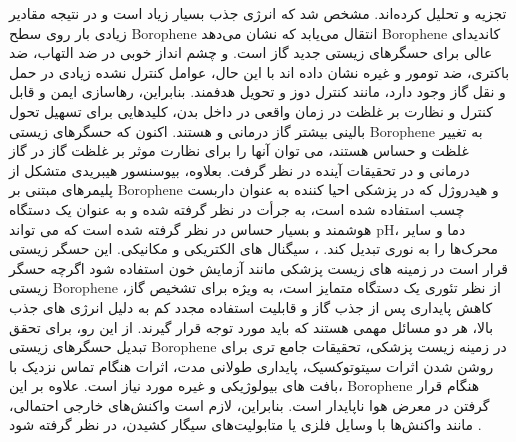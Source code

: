 تجزیه و تحلیل کرده‌اند. مشخص شد که انرژی جذب بسیار زیاد است و در نتیجه مقادیر زیادی بار روی سطح \gls{Borophene} انتقال می‌یابد که نشان می‌دهد \gls{Borophene} کاندیدای عالی برای حسگرهای زیستی جدید گاز است.  و  چشم انداز خوبی در ضد التهاب، ضد باکتری، ضد تومور و غیره نشان داده اند \cite{otterbeinCarbonMonoxideHas2000} با این حال، عوامل کنترل نشده زیادی در حمل و نقل گاز وجود دارد، مانند کنترل دوز و تحویل هدفمند. بنابراین، رهاسازی ایمن و قابل کنترل و نظارت بر غلظت در زمان واقعی در داخل بدن، کلیدهایی برای تسهیل تحول بالینی بیشتر گاز درمانی  و  هستند. اکنون که حسگرهای زیستی \gls{Borophene} به تغییر غلظت  و  حساس هستند، می توان آنها را برای نظارت موثر بر غلظت گاز در گاز درمانی  و  در تحقیقات آینده در نظر گرفت. بعلاوه، بیوسنسور هیبریدی متشکل از پلیمرهای مبتنی بر \gls{Borophene} و هیدروژل که در پزشکی احیا کننده به عنوان داربست چسب استفاده شده است، به جرأت در نظر گرفته شده و به عنوان یک دستگاه هوشمند و بسیار حساس در نظر گرفته شده است که می تواند \gls{pH}، دما و سایر محرک‌ها را به نوری تبدیل کند. ، سیگنال های الکتریکی و مکانیکی. این حسگر زیستی قرار است در زمینه های زیست پزشکی مانند آزمایش خون استفاده شود \cite{inchingoloNonsyndromicMultipleSupernumerary2010} اگرچه حسگر زیستی \gls{Borophene} از نظر تئوری یک دستگاه متمایز است، به ویژه برای تشخیص گاز، کاهش پایداری پس از جذب گاز و قابلیت استفاده مجدد کم به دلیل انرژی های جذب بالا، هر دو مسائل مهمی هستند که باید مورد توجه قرار گیرند. از این رو، برای تحقق تبدیل حسگرهای زیستی \gls{Borophene} در زمینه زیست پزشکی، تحقیقات جامع تری برای روشن شدن اثرات سیتوتوکسیک، پایداری طولانی مدت، اثرات هنگام تماس نزدیک با بافت های بیولوژیکی و غیره مورد نیاز است.\cite{tatulloBorophenePromising2D2019} علاوه بر این، \gls{Borophene} هنگام قرار گرفتن در معرض هوا ناپایدار است. بنابراین، لازم است واکنش‌های خارجی احتمالی، مانند واکنش‌ها با وسایل فلزی \cite{inchingoloOralPiercingOral2011} یا متابولیت‌های سیگار کشیدن، در نظر گرفته شود \cite{tatulloCrosstalkOralGeneral2016}.

